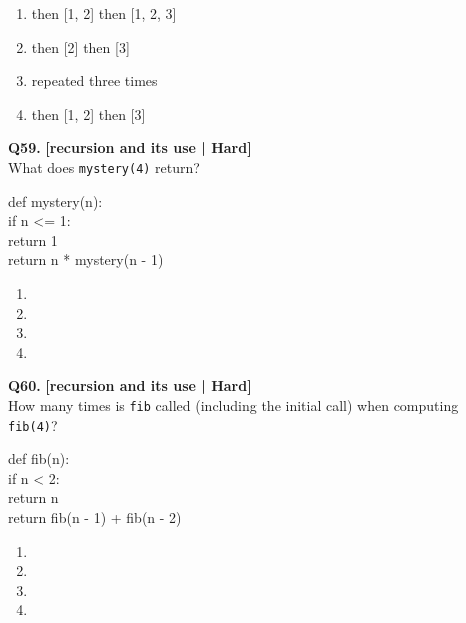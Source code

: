 \begin{enumerate}[label=(\alph*),topsep=2pt,itemsep=1pt,partopsep=0pt,parsep=0pt]
    \item \relax [1] then [1, 2] then [1, 2, 3]
    \item \relax [1] then [2] then [3]
    \item \relax [1, 2, 3] repeated three times
    \item \relax [1] then [1, 2] then [3]
\end{enumerate}
\vspace{2mm}

\noindent\textbf{Q59.} \hfill {\small\color{LPUOrange}\textbf{[recursion and its use | Hard]}}\\[2pt]
What does \texttt{mystery(4)} return? 

\begin{pycode}
def mystery(n):\\
if n <= 1:\\
return 1\\
return n * mystery(n - 1)
\end{pycode}

\begin{enumerate}[label=(\alph*),topsep=2pt,itemsep=1pt,partopsep=0pt,parsep=0pt]
    \item {}
    \item {}
    \item {}
    \item {}
\end{enumerate}
\vspace{2mm}

\noindent\textbf{Q60.} \hfill {\small\color{LPUOrange}\textbf{[recursion and its use | Hard]}}\\[2pt]
How many times is \texttt{fib} called (including the initial call) when computing \texttt{fib(4)}? 

\begin{pycode}
def fib(n):\\
if n < 2:\\
return n\\
return fib(n - 1) + fib(n - 2)
\end{pycode}

\begin{enumerate}[label=(\alph*),topsep=2pt,itemsep=1pt,partopsep=0pt,parsep=0pt]
    \item {}
    \item {}
    \item {}
    \item {}
\end{enumerate}
\vspace{2mm}


